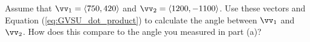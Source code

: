 \begin{pa}
\begin{comment}
\solution The distance from the Recreation Center to the northwest end of Mackinac Hall is $d_1=\sqrt{a^2+b^2}$ and the distance from the Recreation Center to Au Sable Hall is $d_2=\sqrt{c^2+d^2}$. The distance from Au Sable Hall to the northwest end of Mackinac Hall is
\[ \sqrt{(a-c)^2 + (b-d)^2}.\]
Let $\alpha$ the angle between $\vv_1$ and $\vv_2$. The Law of Cosines states that
\[\left(\sqrt{(a-c)^2 + (b-d)^2}\right)^2 = d_1^2+d_2^2 - 2d_1d_2 \cos(\alpha).\]
So
\begin{align*}
(a-c)^2 + (b-d)^2 &= (a^2+b^2) + (c^2+d^2) - 2\sqrt{(a^2+b^2)(c^2+d^2)} \cos(\alpha) \\
(a^2-2ac+c^2) + (b^2-2bd+d^2) &= (a^2+b^2) + (c^2+d^2) - 2\sqrt{a^2+b^2}\sqrt{c^2+d^2} \cos(\alpha) \\
ac + bd &= \sqrt{a^2+b^2}\sqrt{c^2+d^2} \cos(\alpha) \\
\cos(\alpha) &= \frac{ac+bd}{\sqrt{a^2+b^2}\sqrt{c^2+d^2}}.
\end{align*}

\vs

\end{comment}

        \item Assume that ${\vv_1 = \langle 750, 420 \rangle}$ and ${\vv_2 = \langle 1200, -1100 \rangle}$. Use these vectors and Equation (\ref{eq:GVSU_dot_product}) to calculate the angle between $\vv_1$ and $\vv_2$. How does this compare to the angle you measured in part (a)?

\begin{comment}

Using our formula from the previous problem, with $a = 750$, $b=420$, $c=1200$, and $d = -1100$, we have
\[\cos(\alpha) = \frac{(750)(1200)+(420)(-1100)}{\sqrt{750^2+420^2} \sqrt{1200^2+(-1100)^2}} \approx 0.313.\]
So
\[\alpha \approx arccos(-.313) \approx 71.8^{\circ}.\]
This is reasonably close to the measurement made in part (a). We shouldn't expect much more accuracy because of the estimating we had to do to make our measurements. 

\end{comment}

    \ea

\end{pa} \afterpa 